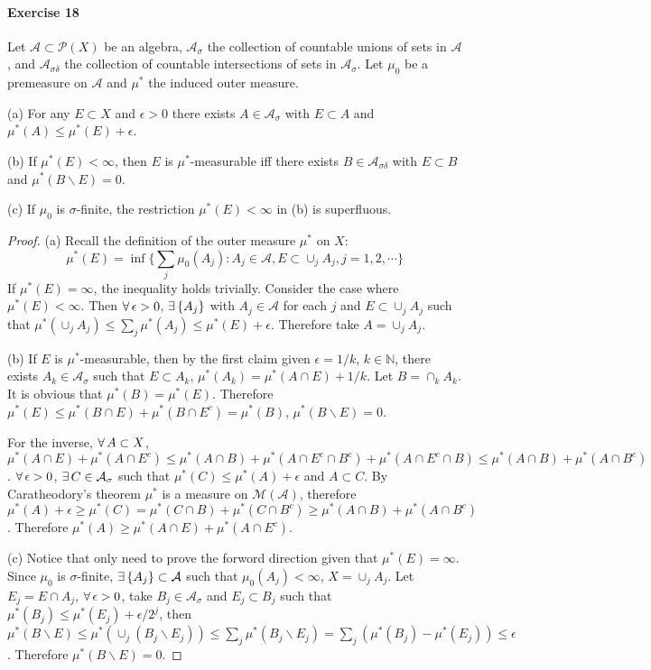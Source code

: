 \paragraph{Exercise 18}
Let $\mathcal{A}\subset\mathcal{P}(X)$ be an algebra, $\mathcal{A}_\sigma$ the collection of countable unions of sets in $\mathcal{A}$, and $\mathcal{A}_{\sigma\delta}$ the collection of countable intersections of sets in $\mathcal{A}_\sigma$. Let $\mu_0$ be a premeasure on $\mathcal{A}$ and $\mu^*$ the induced outer measure.
\par(a) For any $E\subset X$ and $\epsilon>0$ there exists $A\in\mathcal{A}_\sigma$ with $E\subset A$ and $\mu^*(A)\le\mu^*(E)+\epsilon$.
\par(b) If $\mu^*(E)<\infty$, then $E$ is $\mu^*$-measurable iff there exists $B\in\mathcal{A}_{\sigma\delta}$ with $E\subset B$ and $\mu^*(B\backslash E)=0$.
\par(c) If $\mu_0$ is $\sigma$-finite, the restriction $\mu^*(E)<\infty$ in (b) is superfluous.
\begin{proof}
    (a) Recall the definition of the outer measure $\mu^*$ on $X$:
    $$
    \mu^*(E)=\inf\{\sum_j\mu_0(A_j):A_j\in\mathcal{A},E\subset\cup_jA_j,j=1,2,\cdots\}
    $$
    If $\mu^*(E)=\infty$, the inequality holds trivially. Consider the case where $\mu^*(E)<\infty$. Then $\forall\,\epsilon>0$, $\exists\, \{A_j\}$ with $A_j\in\mathcal{A}$ for each $j$ and $E\subset\cup_jA_j$ such that $\mu^*(\cup_jA_j)\le\sum_j\mu^*(A_j)\le\mu^*(E)+\epsilon$. Therefore take $A=\cup_jA_j$.
    \par(b) If $E$ is $\mu^*$-measurable, then by the first claim given $\epsilon=1/k$, $k\in\mathbb{N}$, there exists $A_k\in\mathcal{A}_{\sigma}$ such that $E\subset A_k$, $\mu^*(A_k)=\mu^*(A\cap E)+1/k$. Let $B=\cap_kA_k$. It is obvious that $\mu^*(B)=\mu^*(E)$. Therefore $\mu^*(E)\le\mu^*(B\cap E)+\mu^*(B\cap E^c)=\mu^*(B)$, $\mu^*(B\backslash E)=0$. 
    \par For the inverse, $\forall\, A\subset X$, $\mu^*(A\cap E)+\mu^*(A\cap E^c)\le\mu^*(A\cap B)+\mu^*(A\cap E^c\cap B^c)+\mu^*(A\cap E^c\cap B)\le\mu^*(A\cap B)+\mu^*(A\cap B^c)$. $\forall\, \epsilon>0$, $\exists\, C\in\mathcal{A}_\sigma$ such that $\mu^*(C)\le\mu^*(A)+\epsilon$ and $A\subset C$. By Caratheodory's theorem $\mu^*$ is a measure on $\mathcal{M}(\mathcal{A})$, therefore $\mu^*(A)+\epsilon\ge\mu^*(C)=\mu^*(C\cap B)+\mu^*(C\cap B^c)\ge\mu^*(A\cap B)+\mu^*(A\cap B^c)$. Therefore $\mu^*(A)\ge\mu^*(A\cap E)+\mu^*(A\cap E^c)$.
    \par (c) Notice that only need to prove the forword direction given that $\mu^*(E)=\infty$. Since $\mu_0$ is $\sigma$-finite, $\exists\, \{A_j\}\subset\mathcal{A}$ such that $\mu_0(A_j)<\infty$, $X=\cup_jA_j$. Let $E_j=E\cap A_j$, $\forall\, \epsilon>0$, take $B_j\in\mathcal{A_\sigma}$ and $E_j\subset B_j$ such that $\mu^*(B_j)\le\mu^*(E_j)+\epsilon/2^j$, then $\mu^*(B\backslash E)\le\mu^*(\cup_j(B_j\backslash E_j))\le\sum_j\mu^*(B_j\backslash E_j)=\sum_j(\mu^*(B_j)-\mu^*(E_j))\le\epsilon$. Therefore $\mu^*(B\backslash E)=0$.
\end{proof}
